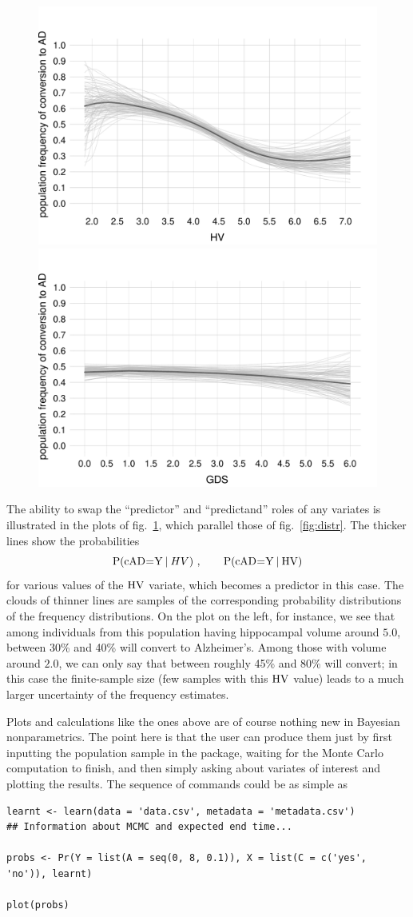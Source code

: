 \medskip

\begin{figure}[t]\caption{}\label{fig:distr_inv}
  \centering
  \includegraphics[width=0.49\linewidth]{figures/prob_conversion_HV.pdf}\hfill%
  \includegraphics[width=0.49\linewidth]{figures/prob_conversion_GDS.pdf}
\end{figure}
The ability to swap the ``predictor'' and ``predictand'' roles of any variates is illustrated in the plots of fig.~\ref{fig:distr_inv}, which parallel those of fig.~\ref{fig:distr}. The thicker lines show the probabilities
\begin{equation*}
    \P( \cAD \mo \yy \| HV)\ ,\qquad
  \P( \cAD \mo \yy \| \HV)
\end{equation*}
for various values of the $\mathrm{HV}$ variate, which becomes a predictor in this case. The clouds of thinner lines are samples of the corresponding probability distributions of the frequency distributions. On the plot on the left, for instance, we see that among individuals from this population having hippocampal volume around $5.0$, between 30\% and 40\% will convert to Alzheimer's. Among those with volume around $2.0$, we can only say that between roughly 45\% and 80\% will convert; in this case the finite-sample size (few samples with this $\mathrm{HV}$ value) leads to a much larger uncertainty of the frequency estimates.

\medskip

Plots and calculations like the ones above are of course nothing new in Bayesian nonparametrics. The point here is that the user can produce them just by first inputting the population sample in the package, waiting for the Monte Carlo computation to finish, and then simply asking about variates of interest and plotting the results. The sequence of commands could be as simple as
\begin{verbatim}
learnt <- learn(data = 'data.csv', metadata = 'metadata.csv')
## Information about MCMC and expected end time...

probs <- Pr(Y = list(A = seq(0, 8, 0.1)), X = list(C = c('yes', 'no')), learnt)

plot(probs)
\end{verbatim}


